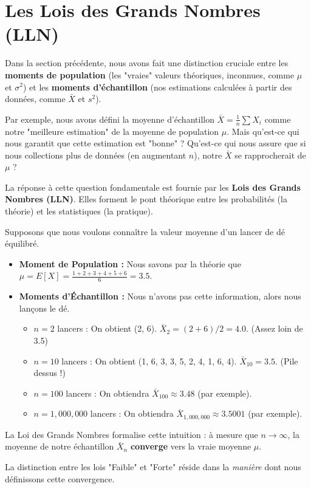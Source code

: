 \newpage

\section{Les Lois des Grands Nombres (LLN)}

Dans la section précédente, nous avons fait une distinction cruciale entre les \textbf{moments de population} (les "vraies" valeurs théoriques, inconnues, comme $\mu$ et $\sigma^2$) et les \textbf{moments d'échantillon} (nos estimations calculées à partir des données, comme $\bar{X}$ et $s^2$).

Par exemple, nous avons défini la moyenne d'échantillon $\bar{X} = \frac{1}{n} \sum X_i$ comme notre "meilleure estimation" de la moyenne de population $\mu$. Mais qu'est-ce qui nous garantit que cette estimation est "bonne" ? Qu'est-ce qui nous assure que si nous collections plus de données (en augmentant $n$), notre $\bar{X}$ se rapprocherait de $\mu$ ?

La réponse à cette question fondamentale est fournie par les \textbf{Lois des Grands Nombres (LLN)}. Elles forment le pont théorique entre les probabilités (la théorie) et les statistiques (la pratique).

\begin{intuitionbox}
Supposons que nous voulons connaître la valeur moyenne d'un lancer de dé équilibré.
\begin{itemize}
    \item \textbf{Moment de Population :} Nous savons par la théorie que $\mu = E[X] = \frac{1+2+3+4+5+6}{6} = 3.5$.
    
    \item \textbf{Moments d'Échantillon :} Nous n'avons pas cette information, alors nous lançons le dé.
    \begin{itemize}
        \item $n=2$ lancers : On obtient (2, 6). $\bar{X}_2 = (2+6)/2 = 4.0$. (Assez loin de 3.5)
        \item $n=10$ lancers : On obtient (1, 6, 3, 3, 5, 2, 4, 1, 6, 4). $\bar{X}_{10} = 3.5$. (Pile dessus !)
        \item $n=100$ lancers : On obtiendra $\bar{X}_{100} \approx 3.48$ (par exemple).
        \item $n=1,000,000$ lancers : On obtiendra $\bar{X}_{1,000,000} \approx 3.5001$ (par exemple).
    \end{itemize}
\end{itemize}
La Loi des Grands Nombres formalise cette intuition : à mesure que $n \to \infty$, la moyenne de notre échantillon $\bar{X}_n$ \textbf{converge} vers la vraie moyenne $\mu$.

La distinction entre les lois "Faible" et "Forte" réside dans la \textit{manière} dont nous définissons cette convergence.
\end{intuitionbox}


